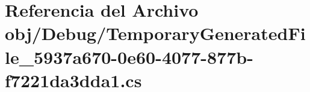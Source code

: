 \hypertarget{Debug_2TemporaryGeneratedFile__5937a670-0e60-4077-877b-f7221da3dda1_8cs}{}\section{Referencia del Archivo obj/\+Debug/\+Temporary\+Generated\+File\+\_\+5937a670-\/0e60-\/4077-\/877b-\/f7221da3dda1.cs}
\label{Debug_2TemporaryGeneratedFile__5937a670-0e60-4077-877b-f7221da3dda1_8cs}
